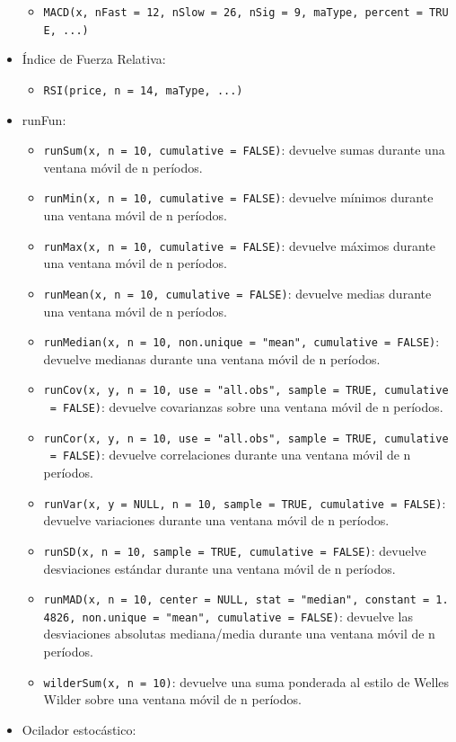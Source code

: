 \documentclass[
]{book}
\providecommand{\tightlist}{%
  \setlength{\itemsep}{0pt}\setlength{\parskip}{0pt}}
\begin{document}
\begin{itemize}
  \begin{itemize}
  \tightlist
  \item
    \texttt{MACD(x,\ nFast\ =\ 12,\ nSlow\ =\ 26,\ nSig\ =\ 9,\ maType,\ percent\ =\ TRUE,\ ...)}
  \end{itemize}
\item
  Índice de Fuerza Relativa:

  \begin{itemize}
  \tightlist
  \item
    \texttt{RSI(price,\ n\ =\ 14,\ maType,\ ...)}
  \end{itemize}
\item
  runFun:

  \begin{itemize}
  \tightlist
  \item
    \texttt{runSum(x,\ n\ =\ 10,\ cumulative\ =\ FALSE)}: devuelve sumas durante una ventana móvil de n períodos.
  \item
    \texttt{runMin(x,\ n\ =\ 10,\ cumulative\ =\ FALSE)}: devuelve mínimos durante una ventana móvil de n períodos.
  \item
    \texttt{runMax(x,\ n\ =\ 10,\ cumulative\ =\ FALSE)}: devuelve máximos durante una ventana móvil de n períodos.
  \item
    \texttt{runMean(x,\ n\ =\ 10,\ cumulative\ =\ FALSE)}: devuelve medias durante una ventana móvil de n períodos.
  \item
    \texttt{runMedian(x,\ n\ =\ 10,\ non.unique\ =\ "mean",\ cumulative\ =\ FALSE)}: devuelve medianas durante una ventana móvil de n períodos.
  \item
    \texttt{runCov(x,\ y,\ n\ =\ 10,\ use\ =\ "all.obs",\ sample\ =\ TRUE,\ cumulative\ =\ FALSE)}: devuelve covarianzas sobre una ventana móvil de n períodos.
  \item
    \texttt{runCor(x,\ y,\ n\ =\ 10,\ use\ =\ "all.obs",\ sample\ =\ TRUE,\ cumulative\ =\ FALSE)}: devuelve correlaciones durante una ventana móvil de n períodos.
  \item
    \texttt{runVar(x,\ y\ =\ NULL,\ n\ =\ 10,\ sample\ =\ TRUE,\ cumulative\ =\ FALSE)}: devuelve variaciones durante una ventana móvil de n períodos.
  \item
    \texttt{runSD(x,\ n\ =\ 10,\ sample\ =\ TRUE,\ cumulative\ =\ FALSE)}: devuelve desviaciones estándar durante una ventana móvil de n períodos.
  \item
    \texttt{runMAD(x,\ n\ =\ 10,\ center\ =\ NULL,\ stat\ =\ "median",\ constant\ =\ 1.4826,\ non.unique\ =\ "mean",\ cumulative\ =\ FALSE)}: devuelve las desviaciones absolutas mediana/media durante una ventana móvil de n períodos.
  \item
    \texttt{wilderSum(x,\ n\ =\ 10)}: devuelve una suma ponderada al estilo de Welles Wilder sobre una ventana móvil de n períodos.
  \end{itemize}
\item
  Ocilador estocástico:


\end{itemize}
\end{document}
